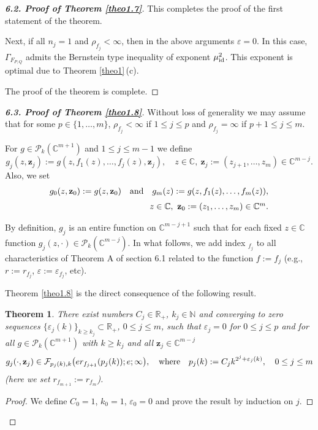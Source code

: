 \documentclass[11pt, oneside]{amsart}
\newtheorem{Th}{Theorem}[section]
\begin{document}
\begin{proof}[{\bf 6.2. Proof of Theorem \ref{theo1.7}}]
This completes the proof of the first statement of the theorem.\smallskip

Next, if all $n_j=1$ and $\rho_{f_j}<\infty$, then in the above arguments $\varepsilon= 0$. In this case,  $\Gamma_{F_{P,Q}}$ admits the Bernstein type inequality of exponent $\mu_{{\rm id}}^2$. This exponent is optimal due to Theorem \ref{theo1}\,(c).

The proof of the theorem is complete.
\end{proof}
\begin{proof}[{\bf 6.3. Proof of Theorem \ref{theo1.8}}]
Without loss of generality we may assume that for some $p\in\{1,\dots,m\}$, 
$\rho_{f_j}<\infty$ if $1\le j\le p$ and $\rho_{f_j}=\infty$ if $p+1\le j\le m$. 

For $g\in\mathcal P_k(\mathbb C^{m+1})$  and $1\le j\le m-1$ we define
\[
g_j(z, \mathbf z_j):=
g(z,f_1(z),\dots, f_j(z), \mathbf z_j), \quad z\in\mathbb C,\
\mathbf z_j:=(z_{j+1},\dots , z_{m})\in\mathbb C^{m-j}.
\]
Also, we set
\[
\begin{array}{r}
g_0(z, \mathbf z_0):=
g(z,\mathbf z_0)\quad {\rm and}\quad  g_{m}(z):=g(z,f_1(z),\dots, f_{m}(z)),\medskip\\
\quad z\in\mathbb C,\  \mathbf z_0:=(z_1,\dots, z_{m})\in\mathbb C^{m}.
\end{array}
\]

By definition, $g_j$ is an entire function on $\mathbb C^{m-j+1}$ such that for each fixed $z\in\mathbb C$ function $g_j(z,\cdot)\in\mathcal P_k(\mathbb  C^{m-j})$. In what follows, we add index $_{f_j}$ to all characteristics of Theorem A of section 6.1 related to the function $f:=f_j$ (e.g., $r:=r_{f_j}$, $\varepsilon:=\varepsilon_{f_j}$, etc).

Theorem \ref{theo1.8} is the direct consequence of the following result.
\begin{Th}\label{theo6.3}
There exist numbers $C_j\in\mathbb R_+$, $k_j\in\mathbb N$ and converging to zero sequences $\{\varepsilon_j(k)\}_{k\ge k_j}\subset\mathbb R_+$, $0\le j\le m$,  such that  $\varepsilon_j= 0$ for $0\le j\le p$ and for all $g\in\mathcal P_k(\mathbb C^{m+1})$ with $k\ge k_j$ and all
$\mathbf z_j\in\mathbb C^{m-j}$
\[
g_j(\cdot, \mathbf z_j)\in\mathcal F_{p_j(k),k}\bigl(er_{f_{j+1}}(p_{j}(k));e;\infty\bigr),\quad {\rm where}\quad
p_j(k):=C_j k^{2^j+\varepsilon_j(k)},\quad 0\le j\le m
\]
(here we set $r_{f_{m+1}}:=r_{f_{m}}$).
\end{Th}
\begin{proof}
We define $C_0=1$, $k_0=1$, $\varepsilon_0= 0$ and 
prove the result by induction on $j$.


\end{proof}
\end{proof}
\end{document}
